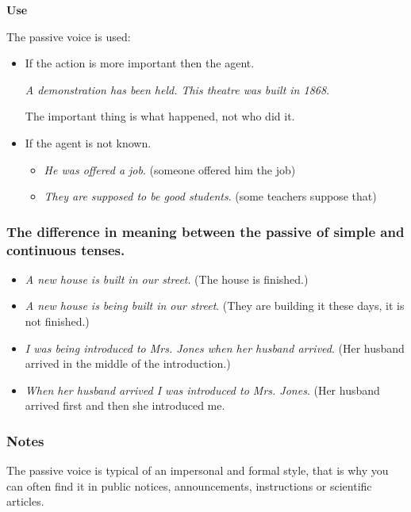 \textbf{Use}

The passive voice is used: 

\begin{itemize}

\item If the action is more important then the agent.

\textit{A demonstration has been held. This theatre was built in 1868}.

The important thing is what happened, not who did it.

\item If the agent is not known.

\begin{itemize}

\item \textit{He was offered a job}. (someone offered him the job)
\item \textit{They are supposed to be good students}. (some teachers suppose that)
\end{itemize}

\end{itemize} 
\subsubsection{The difference in meaning between the passive of simple and continuous tenses.}

\begin{itemize}

\item \textit{A new house is built in our street}.  (The house is finished.) 
\item \textit{A new house is being built in our street}. (They are building it these days, it is not finished.) 
\item \textit{I was being introduced to Mrs. Jones when her husband arrived}. (Her husband arrived in the middle of the introduction.)
\item \textit{When her husband arrived I was introduced to Mrs. Jones}. (Her husband arrived first and then she introduced me.
\end{itemize}

\subsubsection{Notes}

The passive voice is typical of an impersonal and formal style, that is why you can often find it in public notices, announcements, instructions or scientific articles.

